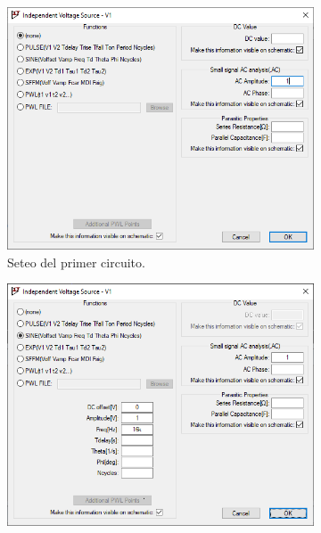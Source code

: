 \documentclass[a4paper]{article} %
\begin{document}
\begin{figure}
	\centering
	\begin{subfigure}[b]{0.45\textwidth}
		\centering %
		\includegraphics[scale=0.5]{IMAGENES/img7} %
		\caption{Seteo del primer circuito.} %
		\label{img7} %
	\end{subfigure}
	\hfill
	\begin{subfigure}[b]{0.45\textwidth}
		\centering %
		\includegraphics[scale=0.5]{IMAGENES/img8} %

\end{subfigure}
\end{figure}
\end{document}
